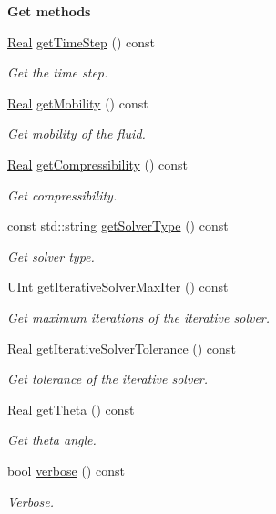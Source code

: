 \begin{Indent}{\bf Get methods}
\begin{DoxyCompactItemize}
\hyperlink{namespaceFVCode3D_a40c1f5588a248569d80aa5f867080e83}{Real} \hyperlink{classFVCode3D_1_1Data_a39afb5e8b836e7e15597850e8740632a}{get\+Time\+Step} () const 
\begin{DoxyCompactList}\small\item\em Get the time step. \end{DoxyCompactList}\item 
\hyperlink{namespaceFVCode3D_a40c1f5588a248569d80aa5f867080e83}{Real} \hyperlink{classFVCode3D_1_1Data_a21aced5c69ae4ee8f3c22624dd6a3e53}{get\+Mobility} () const 
\begin{DoxyCompactList}\small\item\em Get mobility of the fluid. \end{DoxyCompactList}\item 
\hyperlink{namespaceFVCode3D_a40c1f5588a248569d80aa5f867080e83}{Real} \hyperlink{classFVCode3D_1_1Data_a067af6c1a191c83a574a4aba1fd6e2fa}{get\+Compressibility} () const 
\begin{DoxyCompactList}\small\item\em Get compressibility. \end{DoxyCompactList}\item 
const std\+::string \hyperlink{classFVCode3D_1_1Data_a7416ec2cb2d71001ae3a336ac75030d7}{get\+Solver\+Type} () const 
\begin{DoxyCompactList}\small\item\em Get solver type. \end{DoxyCompactList}\item 
\hyperlink{namespaceFVCode3D_a4bf7e328c75d0fd504050d040ebe9eda}{U\+Int} \hyperlink{classFVCode3D_1_1Data_af1dc6d715f4b6efcbbc46e372b967858}{get\+Iterative\+Solver\+Max\+Iter} () const 
\begin{DoxyCompactList}\small\item\em Get maximum iterations of the iterative solver. \end{DoxyCompactList}\item 
\hyperlink{namespaceFVCode3D_a40c1f5588a248569d80aa5f867080e83}{Real} \hyperlink{classFVCode3D_1_1Data_ac5b0bb067586018f05c03979dab7dac2}{get\+Iterative\+Solver\+Tolerance} () const 
\begin{DoxyCompactList}\small\item\em Get tolerance of the iterative solver. \end{DoxyCompactList}\item 
\hyperlink{namespaceFVCode3D_a40c1f5588a248569d80aa5f867080e83}{Real} \hyperlink{classFVCode3D_1_1Data_a3ad43ce405db08e465804cb2494423a1}{get\+Theta} () const 
\begin{DoxyCompactList}\small\item\em Get theta angle. \end{DoxyCompactList}\item 
bool \hyperlink{classFVCode3D_1_1Data_a3f6758048749a9525d2879552b975536}{verbose} () const 
\begin{DoxyCompactList}\small\item\em Verbose. \end{DoxyCompactList}\end{DoxyCompactItemize}
\end{Indent}
